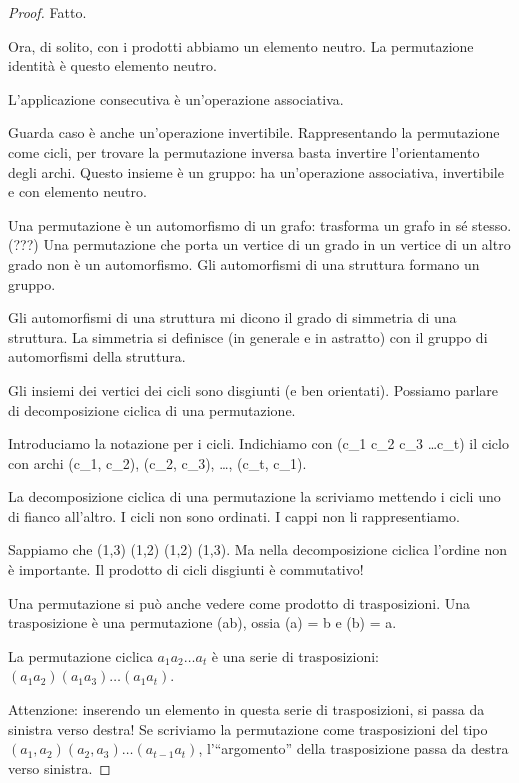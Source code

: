 \begin{proof}
Fatto.

Ora, di solito, con i prodotti abbiamo un elemento neutro.
La permutazione identit\`a \`e questo elemento neutro.

L'applicazione consecutiva \`e un'operazione associativa.


Guarda caso \`e anche un'operazione invertibile.
Rappresentando la permutazione come cicli, per trovare la permutazione inversa basta invertire l'orientamento degli archi.
Questo insieme \`e un gruppo: ha un'operazione associativa, invertibile e con elemento neutro.


Una permutazione \`e un automorfismo di un grafo: trasforma un grafo in s\'e stesso.
(???)
Una permutazione che porta un vertice di un grado in un vertice di un altro grado non \`e un automorfismo.
Gli automorfismi di una struttura formano un gruppo.

Gli automorfismi di una struttura mi dicono il grado di simmetria di una struttura.
La simmetria si definisce (in generale e in astratto) con il gruppo di automorfismi della struttura.

Gli insiemi dei vertici dei cicli sono disgiunti (e ben orientati).
Possiamo parlare di decomposizione ciclica di una permutazione.

Introduciamo la notazione per i cicli.
Indichiamo con (c_1 c_2 c_3 \dots c_t) il ciclo con archi (c_1, c_2), (c_2, c_3), \dots, (c_t, c_1).

La decomposizione ciclica di una permutazione la scriviamo mettendo i cicli uno di fianco all'altro.
I cicli non sono ordinati.
I cappi non li rappresentiamo.

Sappiamo che (1,3) (1,2) \neq (1,2) (1,3).
Ma nella decomposizione ciclica l'ordine non \`e importante.
Il prodotto di cicli disgiunti \`e commutativo!

Una permutazione si pu\`o anche vedere come prodotto di trasposizioni.
Una trasposizione \tau \`e una permutazione (ab), ossia \tau(a) = b e \tau(b) = a.

\begin{oss}
	La permutazione ciclica $a_1 a_2 \dots a_t$ \`e una serie di trasposizioni: $(a_1 a_2) (a_1 a_3) \dots (a_1 a_t)$.
\end{oss}

Attenzione: inserendo un elemento in questa serie di trasposizioni, si passa da sinistra verso destra!
Se scriviamo la permutazione come trasposizioni del tipo $(a_1, a_2) (a_2, a_3) \dots (a_{t-1} a_{t})$, l'``argomento'' della trasposizione passa da destra verso sinistra.


\end{proof}
